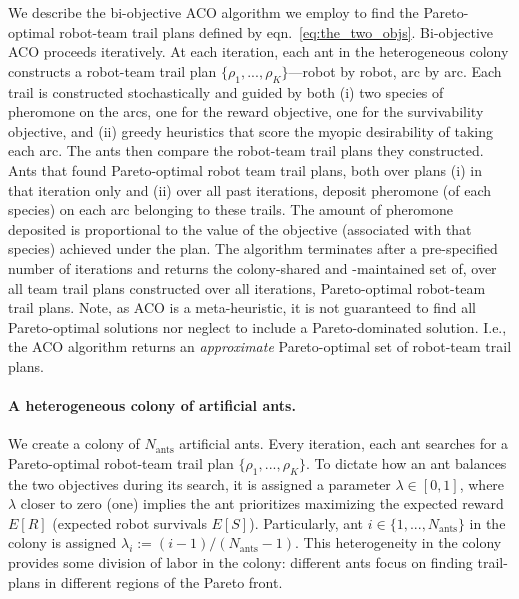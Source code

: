 \documentclass[11pt, oneside]{article}
\begin{document}
We describe the bi-objective ACO \cite{iredi2001bi} algorithm we employ to find the Pareto-optimal robot-team trail plans defined by eqn.~\ref{eq:the_two_objs}. 
Bi-objective ACO proceeds iteratively. 
At each iteration, each ant in the heterogeneous colony constructs a robot-team trail plan $\{\rho_1, ..., \rho_K\}$---robot by robot, arc by arc.
Each trail is constructed stochastically and guided by both (i) two species of pheromone on the arcs, one for the reward objective, one for the survivability objective, and (ii) greedy heuristics that score the myopic desirability of taking each arc. 
The ants then compare the robot-team trail plans they constructed. 
Ants that found Pareto-optimal robot team trail plans, both over plans (i) in that iteration only and (ii) over all past iterations, deposit pheromone (of each species) on each arc belonging to these trails. The amount of pheromone deposited is proportional to the value of the objective (associated with that species) achieved under the plan.
The algorithm terminates after a pre-specified number of iterations and returns the colony-shared and -maintained set of, over all team trail plans constructed over all iterations, Pareto-optimal robot-team trail plans. 
Note, as ACO is a meta-heuristic, it is not guaranteed to find all Pareto-optimal solutions nor neglect to include a Pareto-dominated solution. I.e., the ACO algorithm returns an \emph{approximate} Pareto-optimal set of robot-team trail plans.

\paragraph{A heterogeneous colony of artificial ants.}
We create a colony of $N_{\text{ants}}$ artificial ants.
Every iteration, each ant searches for a Pareto-optimal robot-team trail plan $\{\rho_1, ..., \rho_K\}$.
To dictate how an ant balances the two objectives during its search, it is assigned a parameter $\lambda \in [0, 1]$, where $\lambda$ closer to zero (one) implies the ant prioritizes maximizing the expected reward $E[R]$ (expected robot survivals $E[S]$). 
Particularly, ant $i\in\{1, ..., N_{\text{ants}}\}$ in the colony is assigned $\lambda_i := (i-1) / (N_{\text{ants}}-1)$.
This heterogeneity in the colony provides some division of labor in the colony: different ants focus on finding trail-plans in different regions of the Pareto front. 
\end{document}
